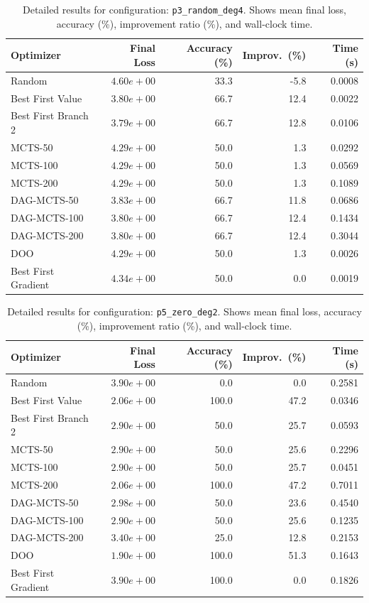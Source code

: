 \begin{table}[H]
\centering
\caption{Detailed results for configuration: \texttt{p3\_random\_deg4}. Shows mean final loss, accuracy (\%), improvement ratio (\%), and wall-clock time.}
\label{tab:funclearn-detail-18}
\begin{tabular}{lrrrr}
\toprule
Optimizer & Final Loss & Accuracy (\%) & Improv.~(\%) & Time (s) \\
\midrule
Random & $4.60e+00$ & 33.3 & -5.8 & 0.0008 \\
\hline
Best First Value & $3.80e+00$ & 66.7 & 12.4 & 0.0022 \\
\hline
Best First Branch 2 & \textbf{$3.79e+00$} & 66.7 & 12.8 & 0.0106 \\
\hline
MCTS-50 & $4.29e+00$ & 50.0 & 1.3 & 0.0292 \\
\hline
MCTS-100 & $4.29e+00$ & 50.0 & 1.3 & 0.0569 \\
\hline
MCTS-200 & $4.29e+00$ & 50.0 & 1.3 & 0.1089 \\
\hline
DAG-MCTS-50 & $3.83e+00$ & 66.7 & 11.8 & 0.0686 \\
\hline
DAG-MCTS-100 & $3.80e+00$ & 66.7 & 12.4 & 0.1434 \\
\hline
DAG-MCTS-200 & $3.80e+00$ & 66.7 & 12.4 & 0.3044 \\
\hline
DOO & $4.29e+00$ & 50.0 & 1.3 & 0.0026 \\
\hline
Best First Gradient & $4.34e+00$ & 50.0 & 0.0 & 0.0019 \\
\bottomrule
\end{tabular}
\end{table}

\begin{table}[H]
\centering
\caption{Detailed results for configuration: \texttt{p5\_zero\_deg2}. Shows mean final loss, accuracy (\%), improvement ratio (\%), and wall-clock time.}
\label{tab:funclearn-detail-19}
\begin{tabular}{lrrrr}
\toprule
Optimizer & Final Loss & Accuracy (\%) & Improv.~(\%) & Time (s) \\
\midrule
Random & $3.90e+00$ & 0.0 & 0.0 & 0.2581 \\
\hline
Best First Value & $2.06e+00$ & 100.0 & 47.2 & 0.0346 \\
\hline
Best First Branch 2 & $2.90e+00$ & 50.0 & 25.7 & 0.0593 \\
\hline
MCTS-50 & $2.90e+00$ & 50.0 & 25.6 & 0.2296 \\
\hline
MCTS-100 & $2.90e+00$ & 50.0 & 25.7 & 0.0451 \\
\hline
MCTS-200 & $2.06e+00$ & 100.0 & 47.2 & 0.7011 \\
\hline
DAG-MCTS-50 & $2.98e+00$ & 50.0 & 23.6 & 0.4540 \\
\hline
DAG-MCTS-100 & $2.90e+00$ & 50.0 & 25.6 & 0.1235 \\
\hline
DAG-MCTS-200 & $3.40e+00$ & 25.0 & 12.8 & 0.2153 \\
\hline
DOO & \textbf{$1.90e+00$} & 100.0 & 51.3 & 0.1643 \\
\hline
Best First Gradient & $3.90e+00$ & 100.0 & 0.0 & 0.1826 \\
\bottomrule
\end{tabular}
\end{table}

